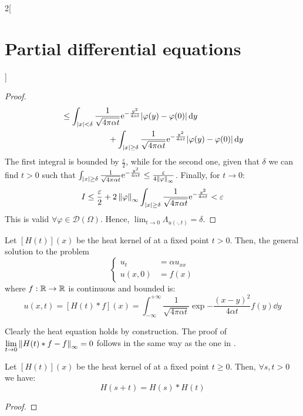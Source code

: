 \documentclass[../../../main_math.tex]{subfiles}
\begin{document}
\begin{multicols}{2}[\section{Partial differential equations}]
\begin{proof}
\begin{align*}
      \begin{split}
        &\leq \int_{\abs{x}<\delta}\frac{1}{\sqrt{4\pi\alpha t}}\mathrm{e}^{-\frac{y^2}{4\alpha t}}\abs{\varphi(y)-\varphi(0)}\dd{y}\\
        &\hspace{2cm}+\int_{\abs{x}\geq\delta}\frac{1}{\sqrt{4\pi\alpha t}}\mathrm{e}^{-\frac{y^2}{4\alpha t}}\abs{\varphi(y)-\varphi(0)}\dd{y}
      \end{split}
    \end{align*}
    The first integral is bounded by $\frac{\varepsilon}{2}$, while for the second one, given that $\delta$ we can find $t>0$ such that $\int_{\abs{x}\geq\delta}\frac{1}{\sqrt{4\pi\alpha t}}\mathrm{e}^{-\frac{y^2}{4\alpha t}}\leq \frac{\varepsilon}{4\left\|\varphi\right\|_\infty}$. Finally, for $t\to 0$:
    $$I\leq \frac{\varepsilon}{2} + 2\left\|\varphi\right\|_\infty\int_{\abs{x}\geq\delta}\frac{1}{\sqrt{4\pi\alpha t}}\mathrm{e}^{-\frac{y^2}{4\alpha t}}<\varepsilon$$
    This is valid $\forall\varphi\in\mathcal{D}(\Omega)$. Hence, $\displaystyle\lim_{t\to 0} \Lambda_{u(\cdot,t)} =\delta$.
  \end{proof}
  \begin{corollary}\label{PDE:heatgeneralcoro}
    Let $[H(t)](x)$ be the heat kernel of  at a fixed point $t>0$. Then, the general solution to the problem
    \begin{equation}\label{PDE:heatgeneral}
      \left\{
      \begin{aligned}
        u_{t}  & =\alpha u_{xx} \\
        u(x,0) & =f(x)
      \end{aligned}
      \right.
    \end{equation}
    where $f:\mathbb{R}\rightarrow\mathbb{R}$ is continuous and bounded is: $$u(x,t)=[H(t)*f](x)=\int_{-\infty}^{+\infty}\frac{1}{\sqrt{4\pi\alpha t}}\exp{-\frac{{(x - y)}^2}{4\alpha t}}f(y)\dd{y}$$
  \end{corollary}
  \begin{sproof}
    Clearly the heat equation holds by construction. The proof of $\displaystyle\lim_{t\to 0}\left\|H(t)*f - f\right\|_\infty=0$ follows in the same way as the one in .
  \end{sproof}
  \begin{proposition}
    Let $[H(t)](x)$ be the heat kernel of  at a fixed point $t\geq 0$. Then, $\forall s,t>0$ we have: $$H(s+t)=H(s)*H(t)$$
  \end{proposition}
  \begin{proof}

\end{proof}
\end{multicols}
\end{document}

